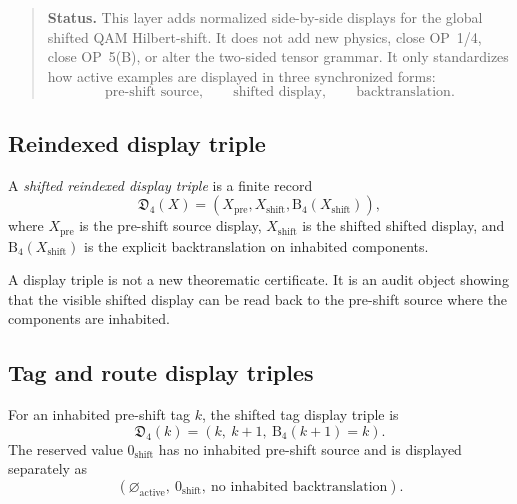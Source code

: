 \begin{quote}\small
\noindent\textbf{Status.}
This layer adds normalized side-by-side displays for the global shifted QAM
Hilbert-shift. It does not add new physics, close OP~1/4, close OP~5(B), or
alter the two-sided tensor grammar. It only standardizes how active examples
are displayed in three synchronized forms:
\[
 \text{pre-shift source},\qquad
 \text{shifted display},\qquad
 \text{backtranslation}.
\]
\end{quote}

\subsection{Reindexed display triple}
\label{subsec:v400-r03-reindexed-display-triple}

\begin{definition}
\label{def:v400-r03-reindexed-display-triple}
A \emph{shifted reindexed display triple} is a finite record
\[
 \mathfrak D_4(X)
 =
 (X_{\mathrm{pre}},X_{\mathrm{shift}},\mathrm B_4(X_{\mathrm{shift}})),
\]
where $X_{\mathrm{pre}}$ is the pre-shift source display, $X_{\mathrm{shift}}$ is the
shifted shifted display, and $\mathrm B_4(X_{\mathrm{shift}})$ is the explicit
backtranslation on inhabited components.
\end{definition}

\begin{remark}
\label{rem:v400-r03-display-triples-are-audit-objects}
A display triple is not a new theorematic certificate. It is an audit object
showing that the visible shifted display can be read back to the pre-shift source where
the components are inhabited.
\end{remark}

\subsection{Tag and route display triples}
\label{subsec:v400-r03-tag-route-display-triples}

\begin{definition}
\label{def:v400-r03-tag-display-triple}
For an inhabited pre-shift tag $k$, the shifted tag display triple is
\[
 \mathfrak D_4(k)
 =
 (k,\ k+1,\ \mathrm B_4(k+1)=k).
\]
The reserved value $0_{\mathrm{shift}}$ has no inhabited pre-shift source and is
displayed separately as
\[
 (\varnothing_{\mathrm{active}},\ 0_{\mathrm{shift}},\ \text{no inhabited backtranslation}).
\]
\end{definition}

